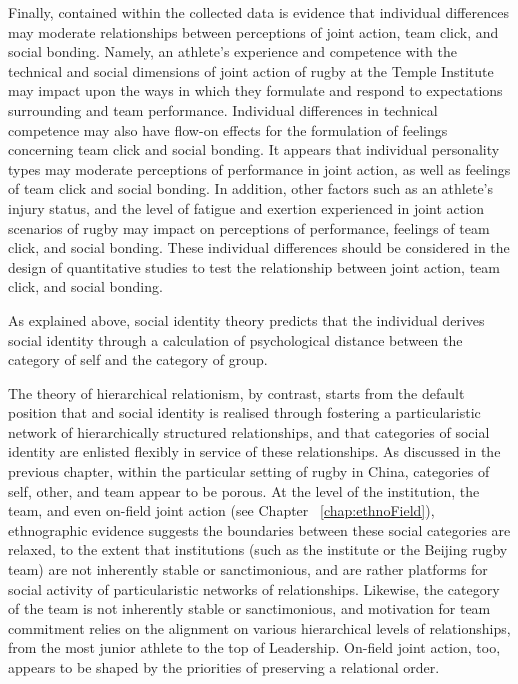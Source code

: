 \begin{CJK}{UTF8}{gbsn}
  Finally, contained within the collected data is evidence that individual differences may moderate relationships between perceptions of joint action, team click, and social bonding.  Namely, an athlete's experience and competence with the technical and social dimensions of joint action of rugby at the Temple Institute may impact upon the ways in which they formulate and respond to expectations surrounding and team performance.  Individual differences in technical competence may also have flow-on effects for the formulation of feelings concerning team click and social bonding. It appears that individual personality types may moderate perceptions of performance in joint action, as well as feelings of team click and social bonding. In addition, other factors such as an athlete's injury status, and the level of fatigue and exertion experienced in joint action scenarios of rugby may impact on perceptions of performance, feelings of team click, and social bonding.  These individual differences should be considered in the design of quantitative studies to test the relationship between joint action, team click, and social bonding.



As explained above, social identity theory predicts that the individual derives social identity through a calculation of psychological distance between the category of self and the category of group.

The theory of hierarchical relationism, by contrast, starts from the default position that and social identity is realised through fostering a particularistic network of hierarchically structured relationships, and that categories of social identity are enlisted flexibly in service of these relationships.  As discussed in the previous chapter, within the particular setting of rugby in China, categories of self, other, and team appear to be porous.  At the level of the institution, the team, and even on-field joint action (see Chapter ~\ref{chap:ethnoField}), ethnographic evidence suggests the boundaries between these social categories are relaxed, to the extent that institutions (such as the institute or the Beijing rugby team) are not inherently stable or sanctimonious, and are rather platforms for social activity of particularistic networks of relationships.  Likewise, the category of the team is not inherently stable or sanctimonious, and motivation for team commitment relies on the alignment on various hierarchical levels of relationships, from the most junior athlete to the top of Leadership. On-field joint action, too, appears to be shaped by the priorities of preserving a relational order.


\end{CJK}
